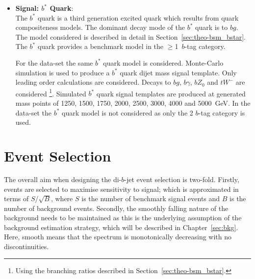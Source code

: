\begin{itemize}[leftmargin=*]
\item\textbf{Signal: $b^*$ Quark}:   \\ 
  The $b^*$ quark is a third generation excited quark which results from
  quark compositeness models.
  The dominant decay mode of the  $b^*$ quark is to $bg$.
  The model considered is
  described in detail in Section~\ref{sec:theo-bsm_bstar}.
  The $b^*$ quark provides a benchmark model in the $\geq$1~$b$-tag category.  \vspace{1em}
  
  For the \summer{} data-set the same $b^*$ quark model is considered.
  Monte-Carlo simulation is used to produce a $b^*$ quark dijet mass signal template.
  Only leading order calculations are considered.
  Decays to $bg$, $b\gamma$, $bZ_0$ and $tW^{-}$ are considered
  \footnote{Using the branching ratios described in Section~\ref{sec:theo-bsm_bstar}.}.
  Simulated $b^*$ quark signal templates are produced at generated mass points of
  1250, 1500, 1750, 2000, 2500, 3000, 4000 and 5000~GeV.
  In the \lm{} data-set the $b^*$ quark model is not considered 
  as only the 2 $b$-tag category is used.
\end{itemize}

\section{Event Selection}
\label{sec:evt-sel}

The overall aim when designing the di-$b$-jet event selection
is two-fold.
Firstly, events are selected to
maximise sensitivity to signal;
which is approximated in terms of $S$/$\sqrt{B}$,
where $S$ is the number of benchmark signal events and $B$ is the number of background events.
Secondly, the smoothly falling nature of the background needs to be maintained
as this is the underlying assumption of the background estimation strategy,
which will be described in Chapter~\ref{sec:bkg}.
Here, smooth means that the spectrum is monotonically decreasing with no discontinuities.

